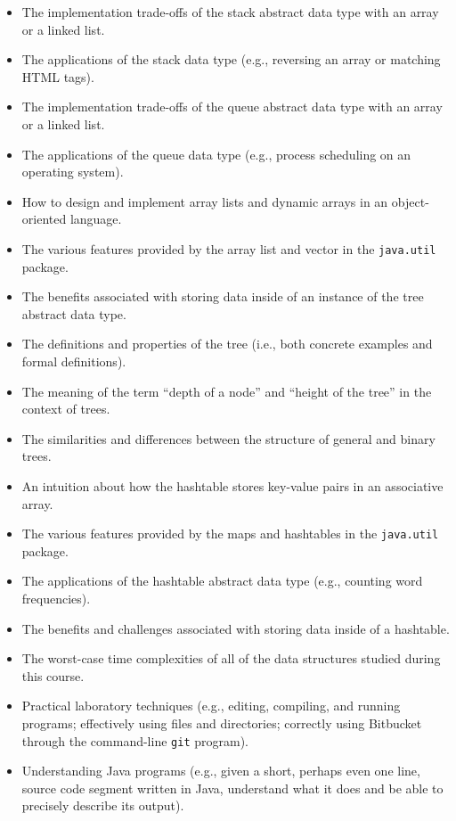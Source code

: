 \begin{itemize}
  \item The implementation trade-offs of the stack abstract data type with an array or a linked list.

  \item The applications of the stack data type (e.g., reversing an array or matching HTML tags).

  \item The implementation trade-offs of the queue abstract data type with an array or a linked list.

  \item The applications of the queue data type (e.g., process scheduling on an operating system).

  \item How to design and implement array lists and dynamic arrays in an object-oriented language.

  \item The various features provided by the array list and vector in the {\tt java.util} package.

  \item The benefits associated with storing data inside of an instance of the tree abstract data type.

  \item The definitions and properties of the tree (i.e., both concrete examples and formal definitions).

  \item The meaning of the term ``depth of a node'' and ``height of the tree'' in the context of trees.

  \item The similarities and differences between the structure of general and binary trees.

  \item An intuition about how the hashtable stores key-value pairs in an associative array.

  \item The various features provided by the maps and hashtables in the {\tt java.util} package.

  \item The applications of the hashtable abstract data type (e.g., counting word frequencies).

  \item The benefits and challenges associated with storing data inside of a hashtable.

  \item The worst-case time complexities of all of the data structures studied during this course.

  \item Practical laboratory techniques (e.g., editing, compiling, and running programs; effectively using files and
    directories; correctly using Bitbucket through the command-line {\tt git} program).

  \item Understanding Java programs (e.g., given a short, perhaps even one line, source code segment written in Java,
    understand what it does and be able to precisely describe its output).


\end{itemize}

